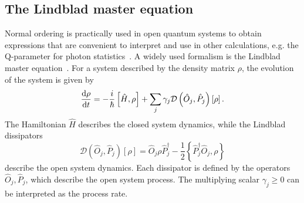 \documentclass[5p, twocolumn, 10pt, sort&compress]{elsarticle}
\newcounter{bla}
\newcommand{\comm}[2]{\left[{#1},{#2}\right]}
\newcommand{\acomm}[2]{\left\{{#1},{#2}\right\}}
\newcommand{\dissip}[1]{\mathcal{D}\left({#1}\right)\left[\rho\right]}
\begin{document}

\subsection{The Lindblad master equation}\label{subsec:LindbladME}

Normal ordering is practically used in open quantum systems to obtain expressions that are convenient to interpret and use in other calculations, e.g. the Q-parameter for photon statistics~\cite{gerry_introductory_2005}. A widely used formalism is the Lindblad master equation~\cite{schlosshauer_decoherence_2007, breuer_theory_2002}.  For a system described by the density matrix $\rho$, the evolution of the system is given by
\begin{equation}\label{eq:LME}
    \odv{\rho}{t} = -\frac{i}{\hbar}\comm{\hat{H}}{\rho} + \sum_j \gamma_j\dissip{\hat{O}_j, \hat{P}_j}.
\end{equation}
The Hamiltonian $\hat{H}$ describes the closed system dynamics, while the Lindblad dissipators 
\begin{equation}
    \dissip{\hat{O}_j, \hat{P}_j} = \hat{O}_j\rho\hat{P}_j^\dagger - \frac{1}{2}\acomm{\hat{P}_j^\dagger\hat{O}_j}{\rho}
\end{equation}
describe the open system dynamics. Each dissipator is defined by the operators $\hat{O}_j, \hat{P}_j$, which describe the open system process.  The multiplying scalar $\gamma_j\geq 0$ can be interpreted as the process rate. 
\end{document}
